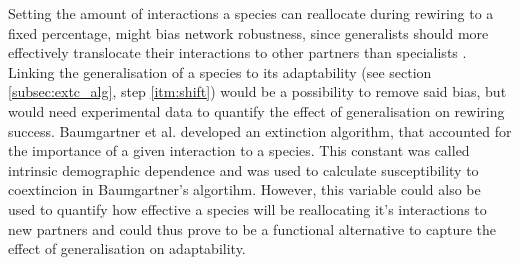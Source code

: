 \documentclass[12pt,a4paper]{article}
\begin{document}

%







%
Setting the amount of interactions a species can reallocate during rewiring to a fixed percentage, might bias network robustness, since generalists should more effectively translocate their interactions to other partners than specialists \parencite{Ramos-Jiliberto2012}. Linking the generalisation of a species to its adaptability (see section \ref{subsec:extc_alg}, step \ref{itm:shift}) would be a possibility to remove said bias, but would need experimental data to quantify the effect of generalisation on rewiring success. Baumgartner et al. \parencite{Baumgartner2020} developed an extinction algorithm, that accounted for the importance of a given interaction to a species. This constant was called intrinsic demographic dependence and was used to calculate susceptibility to coextincion in Baumgartner's algortihm. However, this variable could also be used to quantify how effective a species will be reallocating it's interactions to new partners and could thus prove to be a functional alternative to capture the effect of generalisation on adaptability. \paragraph{}
\end{document}
